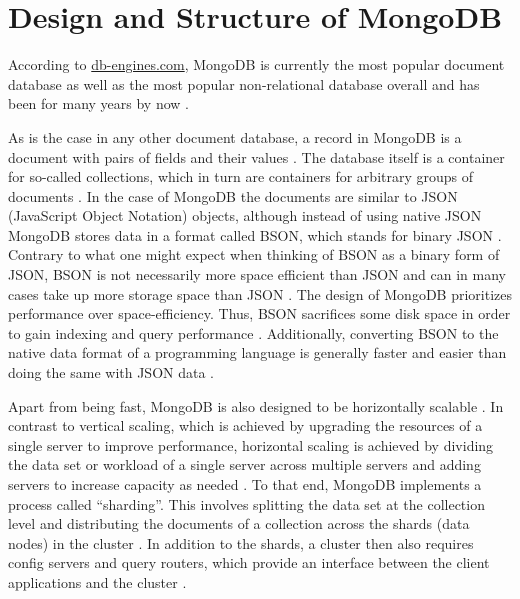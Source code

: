 
\section{Design and Structure of MongoDB}
According to \url{db-engines.com}, MongoDB is currently the most popular document database as well as the most popular non-relational database overall
and has been for many years by now \parencite{DB-Engines-Ranking, DB-Engines-Trend}. 

As is the case in any other document database, a record in MongoDB is a document with pairs of fields and their values \parencite[p. 90]{chauhan2019review}. 
The database itself is a container for so-called collections, which in turn are containers for arbitrary groups of documents \parencite[p. 90]{chauhan2019review}.
In the case of MongoDB the documents are similar to JSON (JavaScript Object Notation) objects, although instead of using native JSON MongoDB stores data 
in a format called BSON, which stands for binary JSON \parencites[p. 4]{Membrey2014}[p. 90]{chauhan2019review}. Contrary to what one might expect when 
thinking of BSON as a binary form of JSON, BSON is not necessarily more space efficient than JSON and can in many cases take up more storage space than JSON \parencite[p. 11]{Membrey2014}. 
The design of MongoDB prioritizes performance over space-efficiency. Thus, BSON sacrifices some disk space in order to gain indexing and query performance \parencite[p. 11]{Membrey2014}.
Additionally, converting BSON to the native data format of a programming language is generally faster and easier than doing the same with JSON data \parencite[p. 11]{Membrey2014}. 

Apart from being fast, MongoDB is also designed to be horizontally scalable \parencite[pp. 2, 6-7]{Membrey2014}. In contrast to vertical scaling, which is achieved by upgrading the resources
of a single server to improve performance, horizontal scaling is achieved by dividing the data set or workload of a single server across multiple servers and adding
servers to increase capacity as needed \parencite{Mongo-Sharding}. To that end, MongoDB implements a process called \enquote{sharding}. This involves splitting the 
data set at the collection level and distributing the documents of a collection across the shards (data nodes) in the cluster \parencites{Mongo-Sharding}[p. 7]{Membrey2014}.
In addition to the shards, a cluster then also requires config servers and query routers, which provide an interface between the 
client applications and the cluster \parencite{Mongo-Sharding}.

